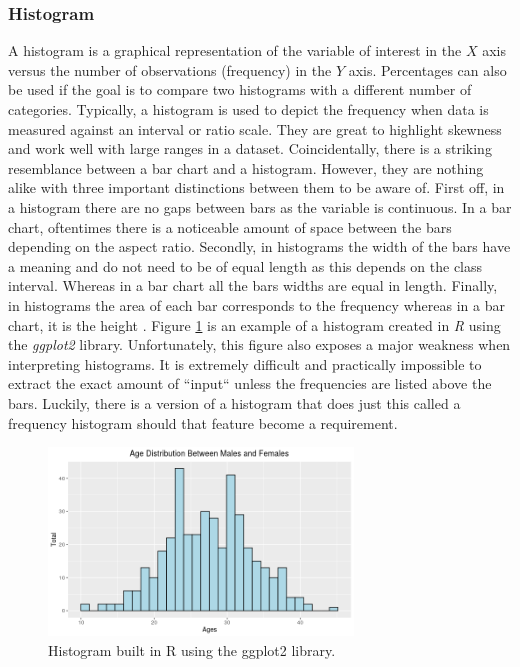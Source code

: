 \subsubsection{Histogram}
A histogram is a graphical representation of the variable of interest in the 
$X$ axis versus the number of observations (frequency) in the $Y$ axis. Percentages 
can also be used if the goal is to compare two histograms with a different number of 
categories. Typically, a histogram is used to depict the frequency when data is 
measured against an interval or ratio scale. They are great to highlight skewness
and work well with large ranges in a dataset. Coincidentally, there is a striking
resemblance between a bar chart and a histogram. However, they are nothing alike 
with three important distinctions between them to be aware of. First off, in a histogram there 
are no gaps between bars as the variable is continuous. In a bar chart, oftentimes 
there is a noticeable amount of space between the bars depending on the aspect
ratio. Secondly, in histograms the width of the bars have a meaning and do not 
need to be of equal length as this depends on the class interval. Whereas in a bar 
chart all the bars widths are equal in length. Finally, in histograms the area 
of each bar corresponds to the frequency whereas in a bar chart, it is the height \cite{c10}. 
Figure \ref{figure:histogram} is an example of a histogram created in \textit{R} 
using the \textit{ggplot2} library. Unfortunately, this figure also exposes a major 
weakness when interpreting histograms. It is extremely difficult and practically 
impossible to extract the exact amount of ``input`` unless the frequencies are listed 
above the bars. Luckily, there is a version of a histogram that does just this 
called a frequency histogram should that feature become a requirement. 

\begin{figure}[H]
    \centering
        \includegraphics[height=5cm]{figures/histogram.png}
    \caption{Histogram built in R using the ggplot2 library.}
    \label{figure:histogram}
\end{figure} 

